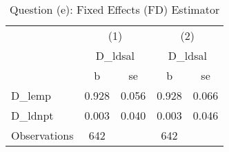 \begin{table}[htbp]\centering
\def\sym#1{\ifmmode^{#1}\else\(^{#1}\)\fi}
\caption{Question (e): Fixed Effects (FD) Estimator}
\begin{tabular}{l*{2}{cc}}
\toprule
                    &\multicolumn{2}{c}{(1)}  &\multicolumn{2}{c}{(2)}  \\
                    &\multicolumn{2}{c}{D\_ldsal}&\multicolumn{2}{c}{D\_ldsal}\\
                    &           b&          se&           b&          se\\
\midrule
D\_lemp              &       0.928&       0.056&       0.928&       0.066\\
D\_ldnpt             &       0.003&       0.040&       0.003&       0.046\\
\midrule
Observations        &         642&            &         642&            \\
\bottomrule
\end{tabular}
\end{table}
